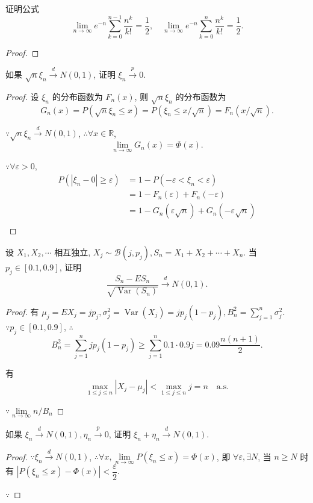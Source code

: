 \documentclass[color=black,device=normal,lang=cn]{elegantnote}
\numberwithin{equation}{section}
\theoremstyle{plain}
\numberwithin{exercise}{exsection}
\begin{document}
\addtocounter{exercise}{3}
\begin{exercise}%
    证明公式
    \[\lim\limits_{n\to\infty}e^{-n}\sum\limits_{k=0}^{n-1}\dfrac{n^k}{k!}=\dfrac{1}{2},\quad\lim\limits_{n\to\infty}e^{-n}\sum\limits_{k=0}^n\dfrac{n^k}{k!}=\dfrac{1}{2}.\]
\end{exercise}
\begin{proof}
    
\end{proof}
\begin{exercise}%
    如果 $\sqrt{n}\xi_n\xrightarrow{d}N(0,1)$, 证明 $\xi_n\xrightarrow{p}0$.
\end{exercise}
\begin{proof}
    设 $\xi_n$ 的分布函数为 $F_n(x)$, 则 $\sqrt{n}\xi_n$ 的分布函数为
    \[G_n(x)=P(\sqrt{n}\xi_n\leq x)=P(\xi_n\leq x/\sqrt{n})=F_n(x/\sqrt{n}).\]
    
    $\because\sqrt{n}\xi_n\xrightarrow{d}N(0,1)$, $\therefore\forall x\in\mathbb{R}$,
    \[\lim\limits_{n\to\infty}G_n(x)=\Phi(x).\]

    $\because\forall\varepsilon>0$,
    \begin{align*}
        P(|\xi_n-0|\geq\varepsilon) & =1-P(-\varepsilon<\xi_n<\varepsilon) \\
        & =1-F_n(\varepsilon)+F_n(-\varepsilon) \\
        & =1-G_n(\varepsilon\sqrt{n})+G_n(-\varepsilon\sqrt{n}) \\
    \end{align*}
\end{proof}
\begin{exercise}%
    设 $X_1,X_2,\cdots$ 相互独立, $X_j\sim\mathcal{B}(j,p_j),S_n=X_1+X_2+\cdots+X_n$. 当 $p_j\in[0.1,0.9]$, 证明
    \[\dfrac{S_n-ES_n}{\sqrt{\operatorname{Var}(S_n)}}\xrightarrow{d}N(0,1).\]
\end{exercise}
\begin{proof}
    有 $\mu_j=EX_j=jp_j,\sigma_j^2=\operatorname{Var}(X_j)=jp_j(1-p_j),B_n^2=\sum\limits_{j=1}^n\sigma_j^2$. $\because p_j\in[0.1,0.9]$, $\therefore$
    \[B_n^2=\sum\limits_{j=1}^njp_j(1-p_j)\geq\sum\limits_{j=1}^n0.1\cdot0.9j=0.09\dfrac{n(n+1)}{2}.\]

    有
    \[\max\limits_{1\leq j\leq n}|X_j-\mu_j|<\max\limits_{1\leq j\leq n}j=n\quad\text{a.s.}\]

    $\because\lim\limits_{n\to\infty}n/B_n$
\end{proof}
\begin{exercise}\label{ex7.25}
    如果 $\xi_n\xrightarrow{d}N(0,1),\eta_n\xrightarrow{p}0$, 证明 $\xi_n+\eta_n\xrightarrow{d}N(0,1)$.
\end{exercise}
\begin{proof}
    $\because\xi_n\xrightarrow{d}N(0,1)$, $\therefore\forall x,\lim\limits_{n\to\infty}P(\xi_n\leq x)=\Phi(x)$, 即 $\forall\varepsilon,\exists N$, 当 $n\geq N$ 时有 $|P(\xi_n\leq x)-\Phi(x)|<\dfrac{\varepsilon}{2}$.

    $\because$
\end{proof}
\end{document}
